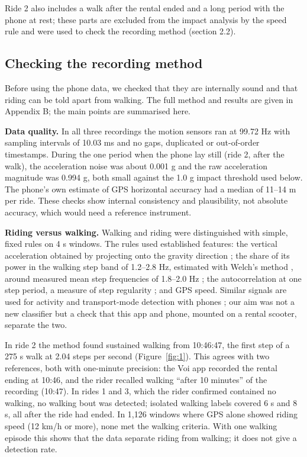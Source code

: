 Ride 2 also includes a walk after the rental ended and a long period with the phone at
rest; these parts are excluded from the impact analysis by the speed rule and were used
to check the recording method (section 2.2).

\subsection{Checking the recording method}\label{checking-the-recording-method}

Before using the phone data, we checked that they are internally sound and that riding
can be told apart from walking. The full method and results are given in Appendix B;
the main points are summarised here.

\textbf{Data quality.} In all three recordings the motion sensors ran at 99.72 Hz with
sampling intervals of 10.03 ms and no gaps, duplicated or out-of-order timestamps. During
the one period when the phone lay still (ride 2, after the walk), the acceleration noise
was about 0.001 g and the raw acceleration magnitude was 0.994 g, both small against the
1.0 g impact threshold used below. The phone's own estimate of GPS horizontal accuracy
had a median of 11--14 m per ride. These checks show internal consistency and
plausibility, not absolute accuracy, which would need a reference instrument.


\textbf{Riding versus walking.} Walking and riding were distinguished with simple, fixed
rules on 4 s windows. The rules used established features: the vertical acceleration
obtained by projecting onto the gravity direction \autocite{mizell2003}; the share of its power
in the walking step band of 1.2--2.8 Hz, estimated with Welch's method \autocite{welch1967},
around measured mean step frequencies of 1.8--2.0 Hz \autocite{pachi2005}; the autocorrelation at
one step period, a measure of step regularity \autocite{moenilssen2004}; and GPS speed. Similar
signals are used for activity and transport-mode detection with phones
\autocite{kwapisz2011,reddy2010}; our aim was not a new classifier but a check that this app
and phone, mounted on a rental scooter, separate the two.


In ride 2 the method found sustained walking from 10:46:47, the first step of a 275 s
walk at 2.04 steps per second (Figure~\ref{fig:1}). This agrees with two references, both with
one-minute precision: the Voi app recorded the rental ending at 10:46, and the rider
recalled walking ``after 10 minutes'' of the recording (10:47). In rides 1 and 3, which
the rider confirmed contained no walking, no walking bout was detected; isolated
walking labels covered 6 s and 8 s, all after the ride had ended. In 1,126 windows where
GPS alone showed riding speed (12 km/h or more), none met the walking criteria. With one
walking episode this shows that the data separate riding from walking; it does not give
a detection rate.

